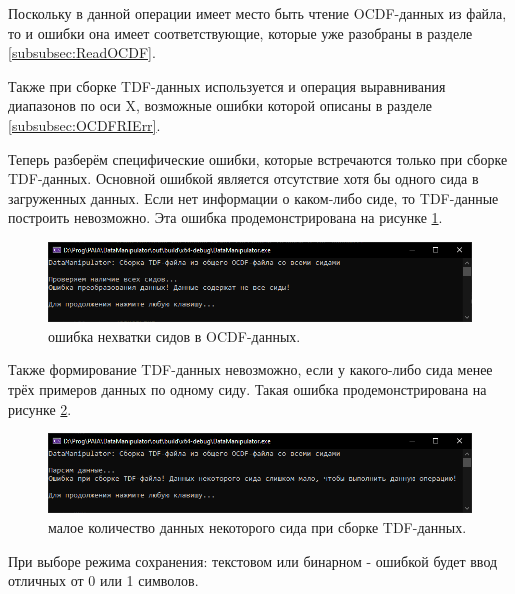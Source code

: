 {\standartFont

  \par Поскольку в данной операции имеет место быть чтение OCDF-данных из файла, то и ошибки она имеет соответствующие, которые уже разобраны в разделе \ref{subsubsec:ReadOCDF}.

  \par Также при сборке TDF-данных используется и операция выравнивания диапазонов по оси X, возможные ошибки которой описаны в разделе \ref{subsubsec:OCDFRIErr}.

  \par Теперь разберём специфические ошибки, которые встречаются только при сборке TDF-данных. Основной ошибкой является отсутствие хотя бы одного сида в загруженных данных. Если нет информации о каком-либо сиде, то TDF-данные построить невозможно. Эта ошибка продемонстрирована на рисунке \ref{fig:CreateTDFErr1}.

  \begin{figure}[H]
    \centering
    \includegraphics[width=\textwidth]{images/forDataManipulator/CreateTDFErr1.png}
    \caption{ошибка нехватки сидов в OCDF-данных.} 
    \label{fig:CreateTDFErr1}
  \end{figure}

  \par Также формирование TDF-данных невозможно, если у какого-либо сида менее трёх примеров данных по одному сиду. Такая ошибка продемонстрирована на рисунке \ref{fig:CreateTDFErr2}.

  \begin{figure}[H]
    \centering
    \includegraphics[width=\textwidth]{images/forDataManipulator/CreateTDFErr2.png}
    \caption{малое количество данных некоторого сида при сборке TDF-данных.} 
    \label{fig:CreateTDFErr2}
  \end{figure}

  \par При выборе режима сохранения: текстовом или бинарном - ошибкой будет ввод отличных от 0 или 1 символов.

  \par
}
